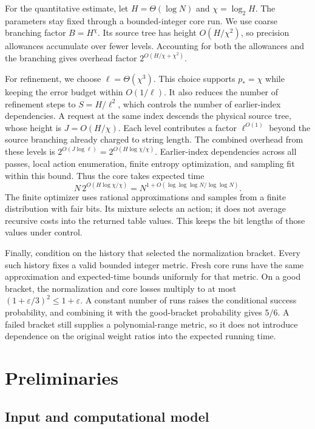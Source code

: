 \documentclass[11pt]{article}
\theoremstyle{definition}
\newcommand{\1}{\mathbf 1}
\begin{document}
For the quantitative estimate, let
$H=\Theta(\log N)$ and $\chi=\log_2H$.
The parameters stay fixed through a bounded-integer core run.
We use coarse branching factor $B=H^\chi$.
Its source tree has height $O(H/\chi^2)$, so precision allowances
accumulate over fewer levels. Accounting for both the allowances and
the branching gives overhead factor $2^{O(H/\chi+\chi^2)}$.

For refinement, we choose $\ell=\Theta(\chi^3)$.
This choice supports $p_*=\chi$ while keeping the error budget within
$O(1/\ell)$. It also reduces the number of refinement steps to
$S=H/\ell^2$, which controls the number of earlier-index dependencies.
A request at the same index descends the physical source tree, whose
height is $J=O(H/\chi)$. Each level contributes a factor
$\ell^{O(1)}$ beyond the source branching already charged to string
length. The combined overhead from these levels is
$2^{O(J\log\ell)}=2^{O(H\log\chi/\chi)}$.
Earlier-index dependencies across all passes, local action enumeration,
finite entropy optimization, and sampling fit within this bound.
Thus the core takes expected time
\[
 N\,2^{O(H\log\chi/\chi)}
 =N^{1+O(\log\log\log N/\log\log N)}.
\]
The finite optimizer uses rational approximations and samples from
a finite distribution with fair bits.
Its mixture selects an action; it does not average recursive costs
into the returned table values.
This keeps the bit lengths of those values under control.

Finally, condition on the history that selected the normalization
bracket. Every such history fixes a valid bounded integer metric.
Fresh core runs have the same approximation and expected-time bounds
uniformly for that metric.
On a good bracket, the normalization and core losses multiply to
at most $(1+\varepsilon/3)^2\le1+\varepsilon$.
A constant number of runs raises the conditional success probability,
and combining it with the good-bracket probability gives $5/6$.
A failed bracket still supplies a polynomial-range metric, so it does
not introduce dependence on the original weight ratios into the
expected running time.

\section{Preliminaries}\label{paper:sec:model}

\subsection{Input and computational model}\label{wrapper:sec:model}
\end{document}
